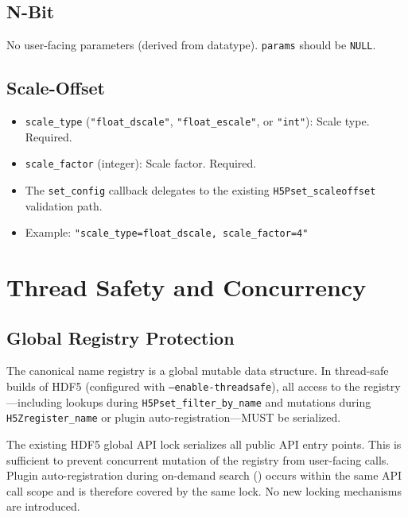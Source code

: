 \documentclass[../HDF5_RFC.tex]{subfiles}
\begin{document}
\subsection{N-Bit}

No user-facing parameters (derived from datatype). \texttt{params} should be
\texttt{NULL}.

\subsection{Scale-Offset}

\begin{itemize}
\item \texttt{scale\_type} (\texttt{"float\_dscale"}, \texttt{"float\_escale"}, or
  \texttt{"int"}): Scale type. Required.
\item \texttt{scale\_factor} (integer): Scale factor. Required.
\item The \texttt{set\_config} callback delegates to the existing
  \texttt{H5Pset\_scaleoffset} validation path.
\item Example: \texttt{"scale\_type=float\_dscale, scale\_factor=4"}
\end{itemize}


\section{Thread Safety and Concurrency}
\label{sec:thread-safety}

\subsection{Global Registry Protection}

The canonical name registry is a global mutable data structure. In
thread-safe builds of HDF5 (configured with \texttt{--enable-threadsafe}), all
access to the registry---including lookups during \texttt{H5Pset\_filter\_by\_name}
and mutations during \texttt{H5Zregister\_name} or plugin auto-registration---MUST
be serialized.

The existing HDF5 global API lock serializes all public API entry points.
This is sufficient to prevent concurrent mutation of the registry from
user-facing calls. Plugin auto-registration during on-demand search
() occurs within the same API call scope and is
therefore covered by the same lock. No new locking mechanisms are introduced.
\end{document}
